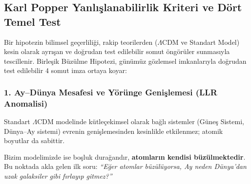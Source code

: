 \subsection{Karl Popper Yanlışlanabilirlik Kriteri ve Dört Temel Test}
\label{sec:yanlislanabilirlik_testleri}

Bir hipotezin bilimsel geçerliliği, rakip teorilerden ($\Lambda$CDM ve Standart Model) kesin olarak ayrışan ve doğrudan test edilebilir somut öngörüler sunmasıyla tescillenir. Birleşik Büzülme Hipotezi, günümüz gözlemsel imkanlarıyla doğrudan test edilebilir 4 somut imza ortaya koyar:

\subsubsection{1. Ay--Dünya Mesafesi ve Yörünge Genişlemesi (LLR Anomalisi)}
Standart $\Lambda$CDM modelinde kütleçekimsel olarak bağlı sistemler (Güneş Sistemi, Dünya--Ay sistemi) evrenin genişlemesinden kesinlikle etkilenmez; atomik boyutlar da sabittir.

Bizim modelimizde ise boşluk durağandır, \textbf{atomların kendisi büzülmektedir}. Bu noktada akla gelen ilk soru: \textit{``Eğer atomlar büzülüyorsa, Ay neden Dünya'dan uzak galaksiler gibi fırlayıp gitmez?''}

